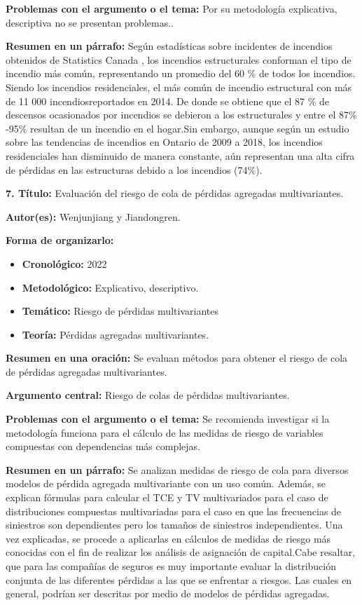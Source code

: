 \documentclass[
  oneside]{memoir}
\begin{document}
\textbf{Problemas con el argumento o el tema:} Por su metodología
explicativa, descriptiva no se presentan problemas..

\textbf{Resumen en un párrafo:} Según estadísticas sobre incidentes de
incendios obtenidos de Statistics Canada , los incendios estructurales
conforman el tipo de incendio más común, representando un promedio del
60 \% de todos los incendios. Siendo los incendios residenciales, el más
común de incendio estructural con más de 11 000 incendiosreportados en
2014. De donde se obtiene que el 87 \% de descensos ocasionados por
incendios se debieron a los estructurales y entre el 87\% -95\% resultan
de un incendio en el hogar.Sin embargo, aunque según un estudio sobre
las tendencias de incendios en Ontario de 2009 a 2018, los incendios
residenciales han disminuido de manera constante, aún representan una
alta cifra de pérdidas en las estructuras debido a los incendios (74\%).

\textbf{ 7. Título:} Evaluación del riesgo de cola de pérdidas agregadas
multivariantes.

\textbf{Autor(es):} Wenjunjiang y Jiandongren.

\textbf{Forma de organizarlo:}

\begin{itemize}

\item \textbf{Cronológico:} 2022

\item \textbf{Metodológico:} Explicativo, descriptivo.

\item \textbf{Temático:} Riesgo de pérdidas multivariantes

\item \textbf{Teoría:} Pérdidas agregadas multivariantes.
\end{itemize}

\textbf{Resumen en una oración:} Se evaluan métodos para obtener el
riesgo de cola de pérdidas agregadas multivariantes.

\textbf{Argumento central:} Riesgo de colas de pérdidas multivariantes.

\textbf{Problemas con el argumento o el tema:} Se recomienda investigar
si la metodología funciona para el cálculo de las medidas de riesgo de
variables compuestas con dependencias más complejas.

\textbf{Resumen en un párrafo:} Se analizan medidas de riesgo de cola
para diversos modelos de pérdida agregada multivariante con un uso
común. Además, se explican fórmulas para calcular el TCE y TV
multivariados para el caso de distribuciones compuestas multivariadas
para el caso en que las frecuencias de siniestros son dependientes pero
los tamaños de siniestros independientes. Una vez explicadas, se procede
a aplicarlas en cálculos de medidas de riesgo más conocidas con el fin
de realizar los análisis de asignación de capital.Cabe resaltar, que
para las compañías de seguros es muy importante evaluar la distribución
conjunta de las diferentes pérdidas a las que se enfrentar a riesgos.
Las cuales en general, podrían ser descritas por medio de modelos de
pérdidas agregadas.
\end{document}

